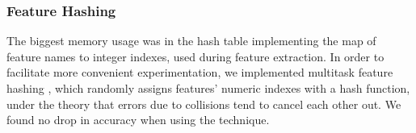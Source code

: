 \documentclass[11pt]{article}
\newcommand{\bocomment}[1]{\textcolor{Bittersweet}{[#1 -BTO]}}
\newcommand{\sam}[1]{\textcolor{blue}{[#1 -SMT]}}
\newcommand{\codenote}[1]{}
\begin{document}
\subsubsection{Feature Hashing}

  The biggest memory usage was in the hash table implementing the map
  of feature names to integer indexes, used during feature extraction.
  In order to facilitate more convenient experimentation, we
  implemented multitask feature hashing
  \cite{weinberger_feature_2009}, which randomly assigns features'
  numeric indexes with a hash function, under the theory that errors
  due to collisions tend to cancel each other out.  We found no
  drop in accuracy when using the technique.


\end{document}
